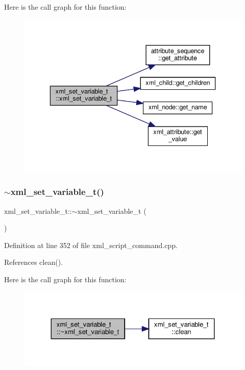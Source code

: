 Here is the call graph for this function\+:
\nopagebreak
\begin{figure}[H]
\begin{center}
\leavevmode
\includegraphics[width=336pt]{dc/db4/classxml__set__variable__t_a9a9810530716baade8f970b659470119_cgraph}
\end{center}
\end{figure}
\mbox{\label{classxml__set__variable__t_a298c84766a17e8730a564b507d5acd44}} 
\subsubsection{\texorpdfstring{$\sim$xml\+\_\+set\+\_\+variable\+\_\+t()}{~xml\_set\_variable\_t()}}
{\footnotesize\ttfamily xml\+\_\+set\+\_\+variable\+\_\+t\+::$\sim$xml\+\_\+set\+\_\+variable\+\_\+t (\begin{DoxyParamCaption}{ }\end{DoxyParamCaption})\hspace{0.3cm}{\ttfamily [override]}}



Definition at line 352 of file xml\+\_\+script\+\_\+command.\+cpp.



References clean().

Here is the call graph for this function\+:
\nopagebreak
\begin{figure}[H]
\begin{center}
\leavevmode
\includegraphics[width=324pt]{dc/db4/classxml__set__variable__t_a298c84766a17e8730a564b507d5acd44_cgraph}
\end{center}
\end{figure}


